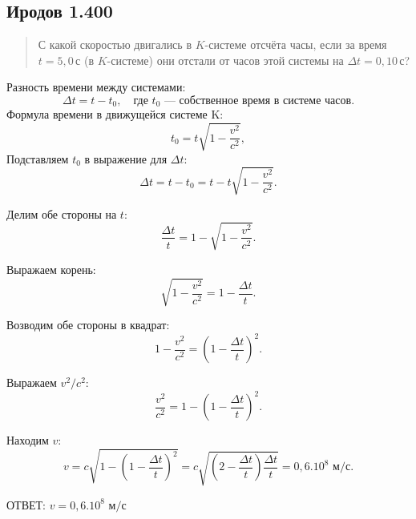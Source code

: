 \subsection*{Иродов 1.400}

\setcounter{equation}{0}

\begin{abstract}
С какой скоростью двигались в $K$-системе отсчёта часы, если за время $t = 5,0 \, \text{с}$ (в $K$-системе) они отстали от часов этой системы на $\Delta t = 0,10 \, \text{с}$?
\end{abstract}

\noindent\hrulefill

Разность времени между системами:
\[
\Delta t = t - t_0, \quad \text{где \(t_0\) — собственное время в системе часов.}
\]
Формула времени в движущейся системе K:
\[
t_0 = t \sqrt{1 - \frac{v^2}{c^2}},
\]
Подставляем \(t_0\) в выражение для \(\Delta t\):
\[
\Delta t = t - t_0 = t - t \sqrt{1 - \frac{v^2}{c^2}}.
\]

Делим обе стороны на \(t\):
\[
\frac{\Delta t}{t} = 1 - \sqrt{1 - \frac{v^2}{c^2}}.
\]

Выражаем корень:
\[
\sqrt{1 - \frac{v^2}{c^2}} = 1 - \frac{\Delta t}{t}.
\]

Возводим обе стороны в квадрат:
\[
1 - \frac{v^2}{c^2} = \left(1 - \frac{\Delta t}{t}\right)^2.
\]

Выражаем \(v^2/c^2\):
\[
\frac{v^2}{c^2} = 1 - \left(1 - \frac{\Delta t}{t}\right)^2.
\]

Находим \(v\):
\[
v = c \sqrt{1 - \left(1 - \frac{\Delta t}{t}\right)^2}  = c \sqrt{(2 - \frac{\Delta t}{t})\frac{\Delta t}{t}} = 0,6.10^8 \text{ м/с}.
\]

ОТВЕТ: 
\(v = 0,6.10^8  \text{ м/с}\)

